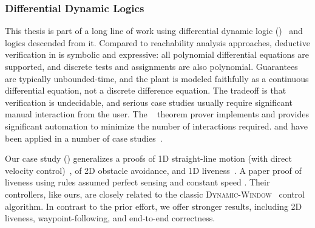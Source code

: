 \documentclass[12pt]{cmuthesis}
\theoremstyle{definition}
\theoremstyle{remark}
\newcommand{\rref}[2][]{\prettyref{#2}}
\begin{document}
\subsubsection{Differential Dynamic Logics}
This thesis is part of a long line of work using differential dynamic logic (\dL)~\cite{DBLP:journals/jar/Platzer08,DBLP:conf/lics/Platzer12a,DBLP:journals/jar/Platzer17} and logics descended from it.
Compared to reachability analysis approaches, deductive verification in \dL is symbolic and expressive: all polynomial differential equations are supported, and discrete tests and assignments are also polynomial.
Guarantees are typically unbounded-time, and the plant is modeled faithfully as a continuous differential equation, not a discrete difference equation.
The tradeoff is that verification is undecidable, and serious case studies usually require significant manual interaction from the user.
The \KeYmaeraX~\cite{DBLP:conf/cade/FultonMQVP15} theorem prover implements \dL and provides significant automation to minimize the number of interactions required.
\dL and \KeYmaeraX have been applied in a number of case studies~\cite{DBLP:conf/cade/Platzer16}.

Our case study (\rref{sec:ground-robotics}) generalizes a \dL proofs of  1D straight-line motion (with direct velocity control)~\cite{DBLP:conf/pldi/BohrerTMMP18}, of 2D obstacle avoidance, and 1D liveness~\cite{DBLP:conf/rss/MitschGP13,DBLP:journals/ijrr/MitschGVP17}.
A paper proof of liveness using \dL rules assumed perfect sensing and constant speed \cite{DBLP:journals/corr/abs-1709-02561}.
Their controllers, like ours, are closely related to the classic \textsc{Dynamic-Window}~\cite{DBLP:journals/ram/FoxBT97} control algorithm.
In contrast to the prior \dL effort, we offer stronger results, including 2D liveness, waypoint-following, and end-to-end correctness.
\end{document}
